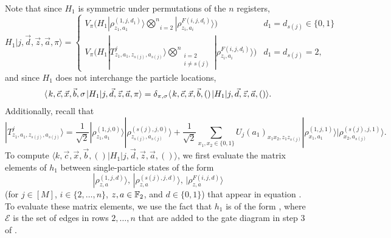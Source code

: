 \documentclass[../thesis-main/thesis-main]{subfiles}
\begin{document}
Note that since $H_{1}$ is symmetric under permutations of the $n$ registers, 
\begin{equation}
H_{1}|j,\vec{d},\vec{z},\vec{a},\pi\rangle=\begin{cases}
V_\pi\Big(H_{1}|\rho_{z_{1},a_{1}}^{(1,j,d_{1})}\rangle\underset{i=2}{\overset{n}{\bigotimes}}|\rho_{z_{i},a_{i}}^{F(i,j,d_{i})}\rangle\Big) & d_{1}=d_{s(j)}\in\{0,1\}\\
V_\pi\Bigg(H_{1}|T_{z_{1},a_{1},z_{s(j)},a_{s(j)}}^{j}\rangle\underset{\substack{i=2\\
i\neq s(j)
}
}{\overset{n}{\bigotimes}}|\rho_{z_{i},a_{i}}^{F(i,j,d_{i})}\rangle\Bigg) & d_{1}=d_{s(j)}=2,
\end{cases}
\label{eq:H1_acting}
\end{equation}
and since $H_1$ does not interchange the particle locations, 
\begin{align}
  \langle\mspace{2mu} k,\vec{c},\vec{x},\vec{b},\sigma  \mspace{2mu} |H_{1}|j,\vec{d},\vec{z},\vec{a},\pi\rangle = \delta_{\pi,\sigma} \langle\mspace{2mu} k,\vec{c},\vec{x},\vec{b},()  \mspace{2mu} |H_{1}|j,\vec{d},\vec{z},\vec{a},()\rangle.
\end{align}
Additionally,  recall that
\begin{equation}
|T_{z_{1},a_{1},z_{s(j)},a_{s(j)}}^{j}\rangle=\frac{1}{\sqrt{2}}|\rho_{z_{1},a_{1}}^{(1,j,0)}\rangle|\rho_{z_{s(j)},a_{s(j)}}^{(s(j),j,0)}\rangle+\frac{1}{\sqrt{2}}\sum_{x_{1},x_{2}\in\{0,1\}}U_{j}(a_{1})_{x_{1}x_{2},z_{1}z_{s(j)}}|\rho_{x_{1},a_{1}}^{(1,j,1)}\rangle|\rho_{x_{2},a_{s(j)}}^{(s(j),j,1)}\rangle.\label{eq:reminder_T_states}
\end{equation}
To compute $\langle k,\vec{c},\vec{x},\vec{b},()|H_{1}|j,\vec{d},\vec{z},\vec{a},()\rangle$, we first evaluate the matrix elements of $h_{1}$ between single-particle states of the form
\begin{equation}
  |\rho_{z,a}^{(1,j,d)}\rangle,\,
  |\rho_{z,a}^{(s(j),j,d)}\rangle,\,
  |\rho_{z,a}^{F(i,j,d)}\rangle
\end{equation}
(for $j\in[M]$, $i\in\{2,\ldots,n\}$, $z,a\in\mathbb{F}_2$, and $d\in\{0,1\}$) that appear in equation . To evaluate these matrix elements, we use the fact that $h_1$ is of the form , where $\mathcal{E}$ is the set of edges in rows $2,\ldots,n$ that are added to the gate diagram in step 3 of .
\end{document}
